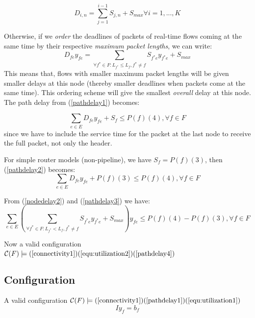 \documentclass[10pt]{article}
\begin{document}
\begin{equation}\label{nodedelay1}
D_{i,n} = \sum_{j=1}^{i-1}S_{j,n}+S_{max} \forall i = 1, ..., K
\end{equation}

Otherwise, if we {\em order} the deadlines of packets of real-time flows coming at
the same time by their respective {\em maximum packet lengths}, we can write:
\begin{equation}\label{nodedelay2}
D_{fe}y_{fe} = \sum_{\forall f^{*} \in F: L_{f^{*}} \leq  L_{f}, f^{*}\neq f }S_{f^{*}e}y_{f^{*}e}+S_{max}
\end{equation}
This means that, flows with smaller maximum packet lengths will be given smaller delays
at this node (thereby smaller deadlines when packets come at the same time). This ordering scheme 
will give the smallest {\em overall} delay at this node.
The path delay from (\ref{pathdelay1}) becomes:

\begin{equation}\label{pathdelay2}
\sum_{e \in E}D_{fe}y_{fe} + S_f \leq P(f)(4), \forall f \in F
\end{equation}
since we have to include the service time for the packet at the last node to 
receive the full packet, not only the header.

For simple router models (non-pipeline), we have $S_f = P(f)(3)$, then (\ref{pathdelay2})
becomes:
\begin{equation}\label{pathdelay3}
\sum_{e \in E}D_{fe}y_{fe} + P(f)(3) \leq P(f)(4), \forall f \in F
\end{equation}

From (\ref{nodedelay2}) and (\ref{pathdelay3}) we have:
\begin{equation}\label{pathdelay4}
\sum_{e \in E} (\sum_{\forall f^{*} \in F:L_{f^{*}} < L_{f}, f^{*} \neq f}S_{f^{*}e}y_{f^{*}e}+S_{max})y_{fe} 
\leq P(f)(4)-P(f)(3), \forall f \in F
\end{equation}

Now a valid configuration $\mathcal{C}(F) \models (\ref{connectivity1}) 
(\ref{equ:utilization2}) (\ref{pathdelay4})$

\subsection{Configuration}
A valid configuration $\mathcal{C}(F) \models (\ref{connectivity1}) 
(\ref{pathdelay1}) (\ref{equ:utilization1})$
\begin{equation}\label{connectivity1}
Iy_f=b_f
\end{equation}
\end{document}
